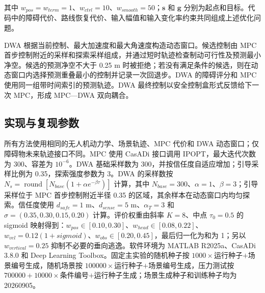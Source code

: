 \documentclass[11pt,a4paper]{ctexart}
\begin{document}
其中 $w_{pos}=w_{term}=1$、$w_{ctrl}=10$、$w_{smooth}=50$；$\mathbf s$ 和 $\mathbf g$ 分别为起点和目标。代码中的障碍代价、路线恢复代价、输入幅值和输入变化率约束共同组成上述优化问题。

DWA 根据当前控制、最大加速度和最大角速度构造动态窗口。候选控制由 MPC 首步控制附近的采样和探索采样组成，并通过短时轨迹检查制动可行性及预测最小净空。候选的预测净空不大于 0.25 m 时被拒绝；若没有满足条件的候选，则在动态窗口内选择预测重叠最小的控制并记录一次回退步。DWA 的障碍评分和 MPC 使用同一组带时间索引的预测轨迹。DWA 最终控制以安全控制盒形式反馈给下一次 MPC，形成 MPC—DWA 双向耦合。

\subsection{实现与复现参数}

所有方法使用相同的无人机动力学、场景轨迹、MPC 代价和 DWA 动态窗口；仅障碍物未来轨迹接口不同。MPC 使用 CasADi 接口调用 IPOPT，最大迭代次数为 300、容差为 $10^{-6}$。DWA 基础采样数为 300，并按信任度自适应增加；引导采样比例为 0.35，探索强度参数为 3。DWA 的采样数按 $N_s=\operatorname{round}[N_{base}(1+\alpha e^{-\beta\tau})]$ 计算，其中 $N_{base}=300$、$\alpha=1$、$\beta=3$；引导采样位于 MPC 首步控制附近半径 0.35 的区域，其余样本在动态窗口内均匀探索。信任度使用 $d_{safe}=1$ m、$d_{sense}=5$ m、$\alpha_T=3$ 和 $\sigma=(0.35,0.30,0.15,0.20)$ 计算。评价权重由斜率 $K=8$、中点 $\tau_0=0.5$ 的 sigmoid 映射得到：$w_{pos}\in[0.10,0.30]$、$w_{head}\in[0.08,0.22]$、$w_{vel}=0.12(1+sigmoid)$、$w_{obs}\in[0.20,0.45]$，最后归一化为和为 1；另以 $w_{vertical}=0.25$ 抑制不必要的垂向逃逸。软件环境为 MATLAB R2025a、CasADi 3.8.0 和 Deep Learning Toolbox。固定主实验的随机种子按 $1000\times$运行种子$+$场景编号生成，随机场景按 $100000\times$运行种子$+$场景编号生成，压力测试按 $700000+10000\times$条件编号$+$运行种子生成；场景生成种子和训练种子均为 20260905。
\end{document}
